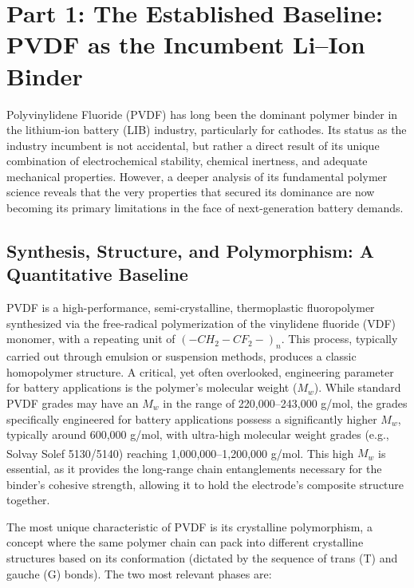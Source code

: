 \documentclass[12pt,a4paper]{article}
\begin{document}
\vspace{1em}

\newpage
\tableofcontents
\newpage

\section{Part 1: The Established Baseline: PVDF as the Incumbent Li--Ion Binder}

Polyvinylidene Fluoride (PVDF) has long been the dominant polymer binder in the lithium-ion battery (LIB) industry, particularly for cathodes. Its status as the industry incumbent is not accidental, but rather a direct result of its unique combination of electrochemical stability, chemical inertness, and adequate mechanical properties. However, a deeper analysis of its fundamental polymer science reveals that the very properties that secured its dominance are now becoming its primary limitations in the face of next-generation battery demands.\citep{ref1}

\subsection{Synthesis, Structure, and Polymorphism: A Quantitative Baseline}

PVDF is a high-performance, semi-crystalline, thermoplastic fluoropolymer synthesized via the free-radical polymerization of the vinylidene fluoride (VDF) monomer, with a repeating unit of $(-CH_{2}-CF_{2}-)_{n}$. This process, typically carried out through emulsion or suspension methods, produces a classic homopolymer structure. A critical, yet often overlooked, engineering parameter for battery applications is the polymer's molecular weight ($M_{w}$). While standard PVDF grades may have an $M_{w}$ in the range of 220,000--243,000 g/mol, the grades specifically engineered for battery applications possess a significantly higher $M_{w}$, typically around 600,000 g/mol, with ultra-high molecular weight grades (e.g., Solvay Solef\textsuperscript{\textregistered} 5130/5140) reaching 1,000,000--1,200,000 g/mol. This high $M_{w}$ is essential, as it provides the long-range chain entanglements necessary for the binder's cohesive strength, allowing it to hold the electrode's composite structure together.\citep{ref40,ref52}

The most unique characteristic of PVDF is its crystalline polymorphism, a concept where the same polymer chain can pack into different crystalline structures based on its conformation (dictated by the sequence of trans (T) and gauche (G) bonds). The two most relevant phases are:
\end{document}

